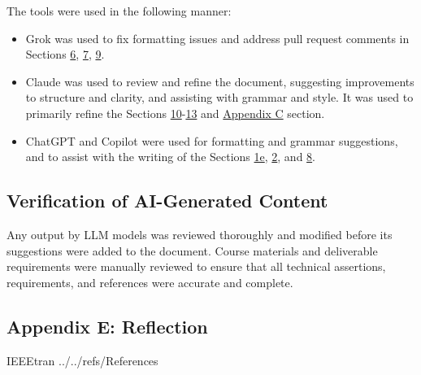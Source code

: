 \documentclass[12pt]{article}
\begin{document}
The tools were used in the following manner:
\begin{itemize}
    \item Grok was used to fix formatting issues and address pull request comments
    in Sections \hyperref[sec_FRs]{6}, \hyperref[sec_DataReqs]{7}, \hyperref[sec_AIReqs]{9}.
    \item Claude was used to review and refine the document, suggesting
    improvements to structure and clarity, and assisting with grammar and style. It
    was used to primarily refine the Sections \hyperref[sec_RTM]{10}-\hyperref[sec_UnlikelyChanges]{13} and \hyperref[sec_AppC]{Appendix C} section.
    \item ChatGPT and Copilot were used for formatting and grammar suggestions, and
    to assist with the writing of the Sections \hyperref[sec_Intro]{1e}, \hyperref[sec_SysOverview]{2}, and \hyperref[sec_NFRs]{8}.
\end{itemize}

\subsection{Verification of AI-Generated Content}

Any output by LLM models was reviewed thoroughly and modified before its suggestions were added to the document. Course materials and deliverable requirements were manually reviewed to ensure that all technical assertions, requirements, and references were accurate and complete.

\subsection{Appendix E: Reflection}



%



\newpage

 {IEEEtran}
 {../../refs/References}

\newpage
\end{document}
